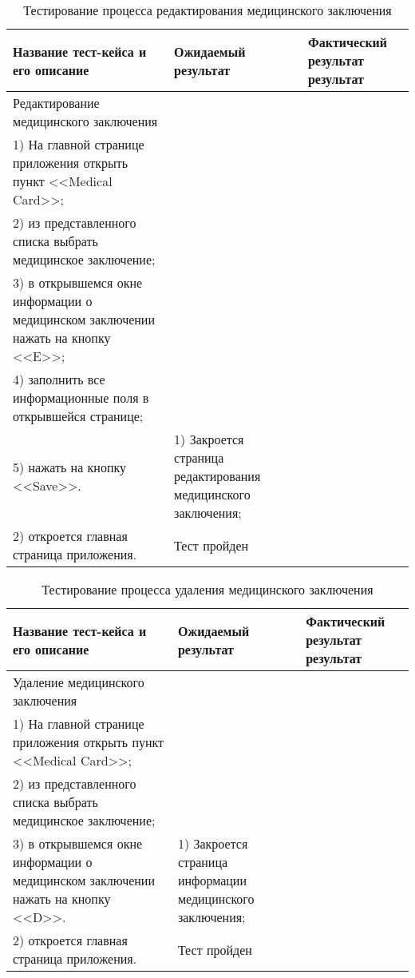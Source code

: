 \begin{longtable}[p]{| >{\raggedright}p{}                     
                     | >{\raggedright}p{}
                     | >{\raggedright\arraybackslash}p{}|}
  \caption{Тестирование процесса редактирования медицинского заключения}
  \label{sec:testing:degradation_2} \tabularnewline

  \hline
      Название тест-кейса и его описание & Ожидаемый результат & Фактический результат результат \\
   \hline
   Редактирование медицинского заключения\\ 
   1) На главной странице приложения открыть пункт <<Medical Card>>; \\
   2) из представленного списка выбрать медицинское заключение;\\
   3) в открывшемся окне информации о медицинском заключении нажать на кнопку <<E>>;\\
   4) заполнить все информационные поля в открывшейся странице;\\
   5) нажать на кнопку <<Save>>.

   &
   1) Закроется страница редактирования медицинского заключения;\\
   2) откроется главная страница приложения.

   &
   Тест пройден \\
   \hline
\end{longtable}

\pagebreak

\begin{longtable}[p]{| >{\raggedright}p{}                     
                     | >{\raggedright}p{}
                     | >{\raggedright\arraybackslash}p{}|}
  \caption{Тестирование процесса удаления медицинского заключения}
  \label{sec:testing:degradation_3} \tabularnewline

  \hline
      Название тест-кейса и его описание & Ожидаемый результат & Фактический результат результат \\
   \hline
   Удаление медицинского заключения\\ 
   1) На главной странице приложения открыть пункт <<Medical Card>>; \\
   2) из представленного списка выбрать медицинское заключение;\\
   3) в открывшемся окне информации о медицинском заключении нажать на кнопку <<D>>.

   &
   1) Закроется страница информации медицинского заключения;\\
   2) откроется главная страница приложения.

   &
   Тест пройден \\
   \hline
\end{longtable}

